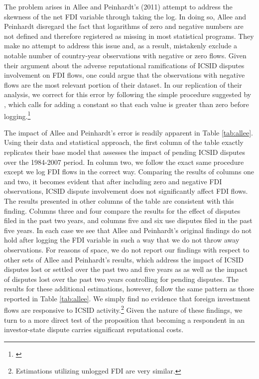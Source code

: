 \documentclass[12pt,onesided]{amsart}
\begin{document}
The problem arises in Allee and Peinhardt's (2011) attempt to address the skewness of the net FDI variable through taking the log. In doing so, Allee and Peinhardt disregard the fact that logarithms of zero and negative numbers are not defined and therefore registered as missing in most statistical programs. They make no attempt to address this issue and, as a result, mistakenly exclude a notable number of country-year observations with negative or zero flows. Given their argument about the adverse reputational ramifications of ICSID disputes involvement on FDI flows, one could argue that the observations with negative flows are the most relevant portion of their dataset. In our replication of their analysis, we correct for this error by following the simple procedure suggested by \citeauthor{li:2009}, which calls for adding a constant so that each value is greater than zero before logging.\footnote{\citet{li:2009}} 

The impact of Allee and Peinhardt's error is readily apparent in Table \ref{tab:allee}. Using their data and statistical approach, the first column of the table exactly replicates their base model that assesses the impact of pending ICSID disputes over the 1984-2007 period. In column two, we follow the exact same procedure except we log FDI flows in the correct way. Comparing the results of columns one and two, it becomes evident that after including zero and negative FDI observations, ICSID dispute involvement does not significantly affect FDI flows. The results presented in other columns of the table are consistent with this finding. Columns three and four compare the results for the effect of disputes filed in the past two years, and columns five and six use disputes filed in the past five years. In each case we see that Allee and Peinhardt's original findings do not hold after logging the FDI variable in such a way that we do not throw away observations. For reasons of space, we do not report our findings with respect to other sets of Allee and Peinhardt's results, which address the impact of ICSID disputes lost or settled over the past two and five years as as well as the impact of disputes lost over the past two years controlling for pending disputes. The results for these additional estimations, however, follow the same pattern as those reported in Table \ref{tab:allee}. We simply find no evidence that foreign investment flows are responsive to ICSID activity.\footnote{Estimations utilizing unlogged FDI are very similar.} Given the nature of these findings, we turn to a more direct test of the proposition that becoming a respondent in an investor-state dispute carries significant reputational costs.
\end{document}
